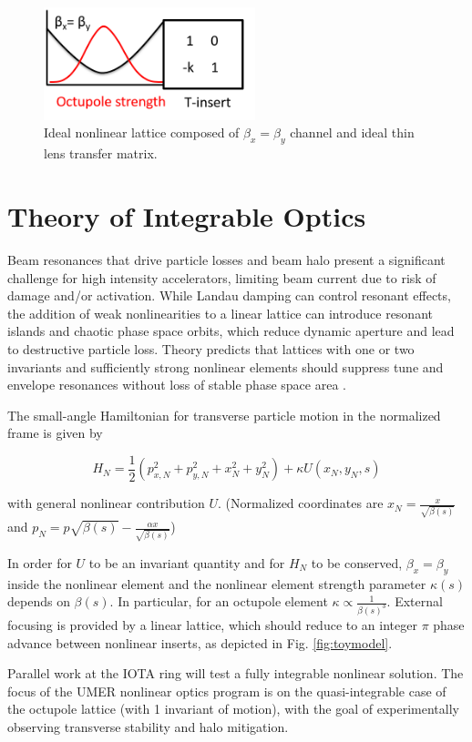 \begin{figure}[!htb]
   \centering
   \includegraphics*[width=174pt]{gen.figures/toy_model}
   \caption{Ideal nonlinear lattice composed of $\beta_x = \beta_y$ channel and ideal thin lens transfer matrix.}
   \label{iota}
\end{figure}











\section{Theory of Integrable Optics}


Beam resonances that drive particle losses and beam halo present a significant challenge for high intensity accelerators, limiting beam current due to risk of damage and/or activation. While Landau damping can control resonant effects, the addition of weak nonlinearities to a linear lattice can introduce resonant islands and chaotic phase space orbits, which reduce dynamic aperture and lead to destructive particle loss. Theory predicts that lattices with one or two invariants and sufficiently strong nonlinear elements should suppress tune and envelope resonances without loss of stable phase space area \cite{Danilov2010}. 

The small-angle Hamiltonian for transverse particle motion in the normalized frame is given by

\begin{equation}
H_N = \frac{1}{2} \left( p_{x,N}^2 + p_{y,N}^2 +x_N^2 + y_N^2 \right) + \kappa U(x_N,y_N,s)
\end{equation}

with general nonlinear contribution $U$. (Normalized coordinates are $x_N = \frac{x}{\sqrt{\beta(s)}}$ and $p_N = p\sqrt{\beta(s)}-\frac{\alpha x}{\sqrt{\beta(s)}}$)

In order for $U$ to be an invariant quantity and for $H_N$ to be conserved, $\beta_x=\beta_y$ inside the nonlinear element and the nonlinear element strength parameter $\kappa (s)$ depends on $\beta (s)$. In particular, for an octupole element $\kappa \propto \frac{1}{\beta(s)^3}$. External focusing is provided by a linear lattice, which should reduce to an integer $\pi$ phase advance between nonlinear inserts, as depicted in Fig. \ref{fig:toymodel}. 

Parallel work at the IOTA ring \cite{antipov} will test a fully integrable nonlinear solution. The focus of the UMER nonlinear optics program is on the quasi-integrable case of the octupole lattice (with 1 invariant of motion), with the goal of experimentally observing transverse stability and halo mitigation. 
